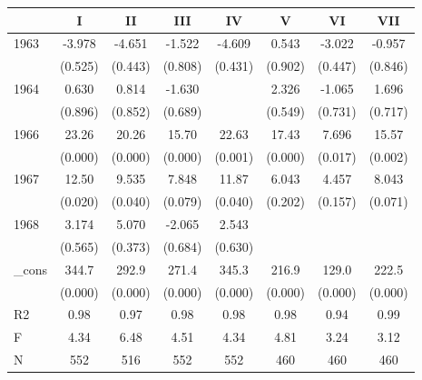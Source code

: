 \begin{tabular}{l*{7}{c}}
\hline\hline
            &\multicolumn{1}{c}{I}&\multicolumn{1}{c}{II}&\multicolumn{1}{c}{III}&\multicolumn{1}{c}{IV}&\multicolumn{1}{c}{V}&\multicolumn{1}{c}{VI}&\multicolumn{1}{c}{VII}\\
\hline
1963        &      -3.978&      -4.651&      -1.522&      -4.609&       0.543&      -3.022&      -0.957\\
            &     (0.525)&     (0.443)&     (0.808)&     (0.431)&     (0.902)&     (0.447)&     (0.846)\\
[1em]
1964        &       0.630&       0.814&      -1.630&            &       2.326&      -1.065&       1.696\\
            &     (0.896)&     (0.852)&     (0.689)&            &     (0.549)&     (0.731)&     (0.717)\\
[1em]
1966        &       23.26&       20.26&       15.70&       22.63&       17.43&       7.696&       15.57\\
            &     (0.000)&     (0.000)&     (0.000)&     (0.001)&     (0.000)&     (0.017)&     (0.002)\\
[1em]
1967        &       12.50&       9.535&       7.848&       11.87&       6.043&       4.457&       8.043\\
            &     (0.020)&     (0.040)&     (0.079)&     (0.040)&     (0.202)&     (0.157)&     (0.071)\\
[1em]
1968        &       3.174&       5.070&      -2.065&       2.543&            &            &            \\
            &     (0.565)&     (0.373)&     (0.684)&     (0.630)&            &            &            \\
[1em]
\_cons      &       344.7&       292.9&       271.4&       345.3&       216.9&       129.0&       222.5\\
            &     (0.000)&     (0.000)&     (0.000)&     (0.000)&     (0.000)&     (0.000)&     (0.000)\\
\hline
R2          &        0.98&        0.97&        0.98&        0.98&        0.98&        0.94&        0.99\\
F           &        4.34&        6.48&        4.51&        4.34&        4.81&        3.24&        3.12\\
N           &         552&         516&         552&         552&         460&         460&         460\\
\hline\hline
\end{tabular}
